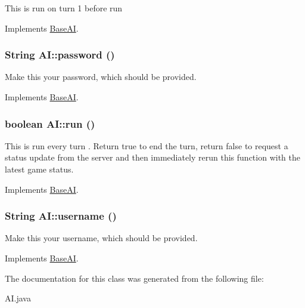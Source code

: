 This is run on turn 1 before run 

Implements \hyperlink{classBaseAI_71b49f4ca248bfd32a9f9557cb6d494a}{BaseAI}.\hypertarget{classAI_405047fd39e03de993183392a06d655b}{
\subsubsection[{password}]{\setlength{\rightskip}{0pt plus 5cm}String AI::password ()}}
\label{classAI_405047fd39e03de993183392a06d655b}


Make this your password, which should be provided. 

Implements \hyperlink{classBaseAI_8607533e2b5bd9920ded593ae6509f48}{BaseAI}.\hypertarget{classAI_f25b3a076daef2aaf9f74ecf458bdfbc}{
\subsubsection[{run}]{\setlength{\rightskip}{0pt plus 5cm}boolean AI::run ()}}
\label{classAI_f25b3a076daef2aaf9f74ecf458bdfbc}


This is run every turn . Return true to end the turn, return false to request a status update from the server and then immediately rerun this function with the latest game status. 

Implements \hyperlink{classBaseAI_56c96a58c1f1e93d17f9817711a45594}{BaseAI}.\hypertarget{classAI_d7e6db6b414a192ad2af8656d012cfdc}{
\subsubsection[{username}]{\setlength{\rightskip}{0pt plus 5cm}String AI::username ()}}
\label{classAI_d7e6db6b414a192ad2af8656d012cfdc}


Make this your username, which should be provided. 

Implements \hyperlink{classBaseAI_a26770dd7db8dd0c4466dd770d4e05ba}{BaseAI}.

The documentation for this class was generated from the following file:\begin{CompactItemize}
\item 
AI.java\end{CompactItemize}
